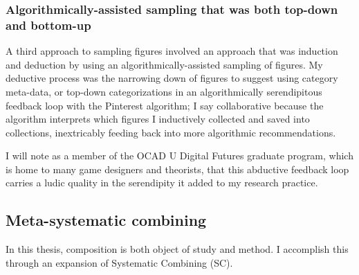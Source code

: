 \subsubsection{Algorithmically-assisted sampling that was both top-down and bottom-up}
A third approach to sampling figures involved an approach that was induction and deduction by using an algorithmically-assisted sampling of figures. My deductive process was the narrowing down of figures to suggest using category meta-data, or top-down categorizations in an algorithmically serendipitous feedback loop with the Pinterest algorithm; I say collaborative because the algorithm interprets which figures I inductively collected and saved into collections, inextricably feeding back into more algorithmic recommendations.

I will note as a member of the OCAD U Digital Futures graduate program, which is home to many game designers and theorists, that this abductive feedback loop carries a ludic quality in the serendipity it added to my research practice.

\subsection{Meta-systematic combining}
In this thesis, composition is both object of study and method. I accomplish this through an expansion of Systematic Combining (SC). 

